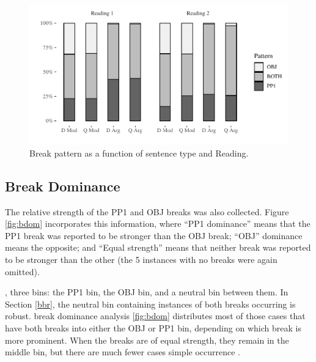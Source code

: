 \documentclass[12pt,oneside]{book}
\begin{document}
\begin{figure}
\centering
\includegraphics{4-results_files/figure-latex/bothbreaks2-1.pdf}
\caption{\label{fig:bothbreaks2}Break pattern as a function of sentence type and Reading.}
\end{figure}

\hypertarget{break-dominance}{%
\subsection{Break Dominance}\label{break-dominance}}

The relative strength of the PP1 and OBJ breaks was also collected. Figure \ref{fig:bdom} incorporates this information, where ``PP1 dominance'' means that the PP1 break was reported to be stronger than the OBJ break; ``OBJ'' dominance means the opposite; and ``Equal strength'' means that neither break was reported to be stronger than the other (the 5 instances with no breaks were again omitted).

,  three bins: the PP1  bin, the OBJ  bin, and a neutral  bin between them. In Section \ref{bbr}, the neutral bin containing instances of both breaks occurring is robust.  break dominance analysis  \ref{fig:bdom} distributes most of those cases that have both breaks into either the OBJ or PP1 bin, depending on which break is more prominent. When the breaks are of equal strength, they remain in the middle bin, but there are much fewer  cases   simple occurrence .
\end{document}
